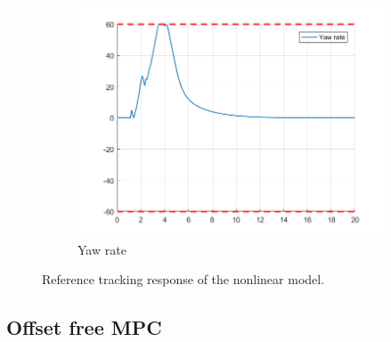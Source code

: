 \documentclass[11pt]{article}
\begin{document}
\begin{enumerate}
\begin{figure}[ht]
\begin{subfigure}[c]{0.3\linewidth}
            \includegraphics[width=\linewidth]{Plots_07_NonlinearModel_ReferenceTracking/09}
            \caption{Yaw rate}
        \end{subfigure}
        \caption{Reference tracking response of the nonlinear model.}
        \label{fig:nonlinear_reference_tracking_with_offset}
\end{figure}
\end{enumerate}



\subsection*{Offset free MPC} %
\label{sub:offset_free_mpc}
\end{document}

